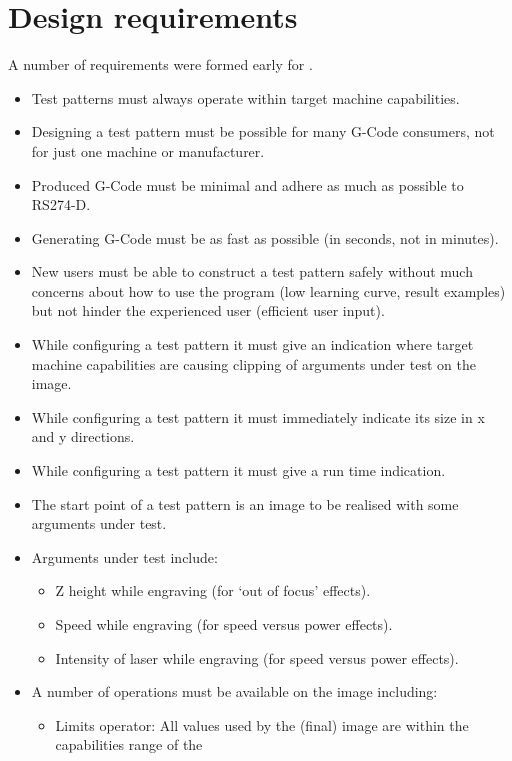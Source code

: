 \section{Design requirements}
A number of requirements were formed early for \GS.
\begin{itemize}
    \item Test patterns must always operate within target machine capabilities.
    \item Designing a test pattern must be possible for many G-Code consumers, not for just one machine or manufacturer.
    \item Produced G-Code must be minimal and adhere as much as possible to RS274-D.
    \item Generating G-Code must be  as fast as possible (in seconds, not in minutes).
    \item New users must be able to construct a test pattern safely without much concerns about how to use the program
          (low learning curve, result examples) but not hinder the experienced user (efficient user input).
    \item While configuring a test pattern it must give an indication where target machine capabilities are
          causing clipping of arguments under test on the image.
    \item While configuring a test pattern it must immediately indicate its size in x and y directions.
    \item While configuring a test pattern it must give a run time indication.
    \item The start point of a test pattern is an image to be realised with some arguments under test.
    \item Arguments under test include:
          \begin{itemize}
              \item Z height while engraving (for `out of focus' effects).
              \item Speed while engraving (for speed versus power effects).
              \item Intensity of laser while engraving (for speed versus power effects).
          \end{itemize}
    \item A number of operations must be available on the image including:
          \begin{itemize}
              \item Limits operator: All values used by the (final) image are within the capabilities range of the

\end{itemize}
\end{itemize}
